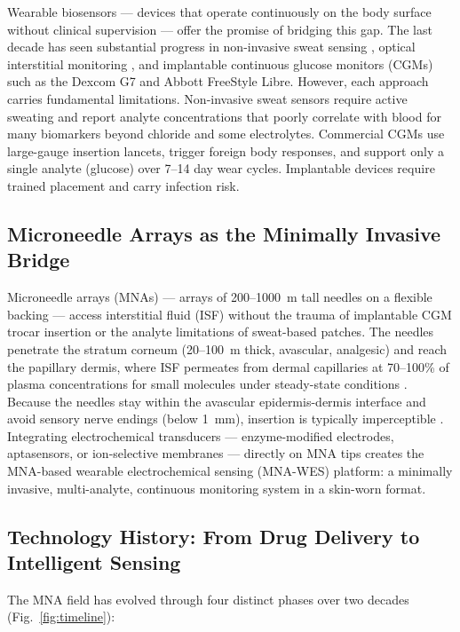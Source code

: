 \documentclass[review,1p]{elsarticle}
\begin{document}
Wearable biosensors — devices that operate continuously on the body surface without clinical supervision — offer the promise of bridging this gap. The last decade has seen substantial progress in non-invasive sweat sensing \cite{Bandodkar2021SEBS}, optical interstitial monitoring \cite{Pickup2005ISF}, and implantable continuous glucose monitors (CGMs) such as the Dexcom G7 and Abbott FreeStyle Libre. However, each approach carries fundamental limitations. Non-invasive sweat sensors require active sweating and report analyte concentrations that poorly correlate with blood for many biomarkers beyond chloride and some electrolytes. Commercial CGMs use large-gauge insertion lancets, trigger foreign body responses, and support only a single analyte (glucose) over 7--14 day wear cycles. Implantable devices require trained placement and carry infection risk.

\subsection{Microneedle Arrays as the Minimally Invasive Bridge}
\label{subsec:mna_bridge}

Microneedle arrays (MNAs) — arrays of 200--1000~\textmu{}m tall needles on a flexible backing — access interstitial fluid (ISF) without the trauma of implantable CGM trocar insertion or the analyte limitations of sweat-based patches. The needles penetrate the stratum corneum (20--100~\textmu{}m thick, avascular, analgesic) and reach the papillary dermis, where ISF permeates from dermal capillaries at 70--100\% of plasma concentrations for small molecules under steady-state conditions \cite{Wang2006MNAreview}. Because the needles stay within the avascular epidermis-dermis interface and avoid sensory nerve endings (below 1~mm), insertion is typically imperceptible \cite{Tehrani2022NatBiomedEng}. Integrating electrochemical transducers — enzyme-modified electrodes, aptasensors, or ion-selective membranes — directly on MNA tips creates the MNA-based wearable electrochemical sensing (MNA-WES) platform: a minimally invasive, multi-analyte, continuous monitoring system in a skin-worn format.

\subsection{Technology History: From Drug Delivery to Intelligent Sensing}
\label{subsec:history}

The MNA field has evolved through four distinct phases over two decades (Fig.~\ref{fig:timeline}):
\end{document}
